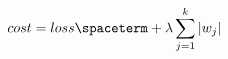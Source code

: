 \documentclass[preview]{standalone}
\begin{document}
\begin{align*}
cost = loss\spaceterm + \lambda\sum_{j=1}^{k}\left|w_{j}\right|
\end{align*}
\end{document}
